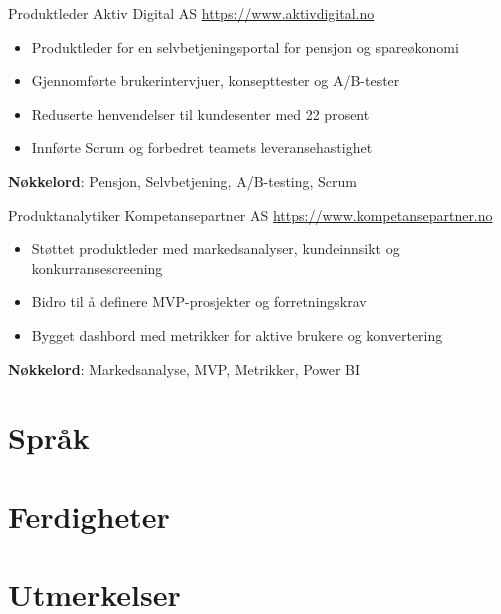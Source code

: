\documentclass[a4paper, serif, 10pt]{moderncv}
\begin{document}
        {Produktleder}
        {Aktiv Digital AS}
        {\url{https://www.aktivdigital.no}}
        {}
        {\begin{itemize}
\item Produktleder for en selvbetjeningsportal for pensjon og spareøkonomi
\item Gjennomførte brukerintervjuer, konsepttester og A/B-tester
\item Reduserte henvendelser til kundesenter med 22 prosent
\item Innførte Scrum og forbedret teamets leveransehastighet
\end{itemize}
\textbf{Nøkkelord}: Pensjon, Selvbetjening, A/B-testing, Scrum}

        {Produktanalytiker}
        {Kompetansepartner AS}
        {\url{https://www.kompetansepartner.no}}
        {}
        {\begin{itemize}
\item Støttet produktleder med markedsanalyser, kundeinnsikt og konkurransescreening
\item Bidro til å definere MVP-prosjekter og forretningskrav
\item Bygget dashbord med metrikker for aktive brukere og konvertering
\end{itemize}
\textbf{Nøkkelord}: Markedsanalyse, MVP, Metrikker, Power BI}
\section{Språk}

\section{Ferdigheter}

\section{Utmerkelser}
\end{document}
